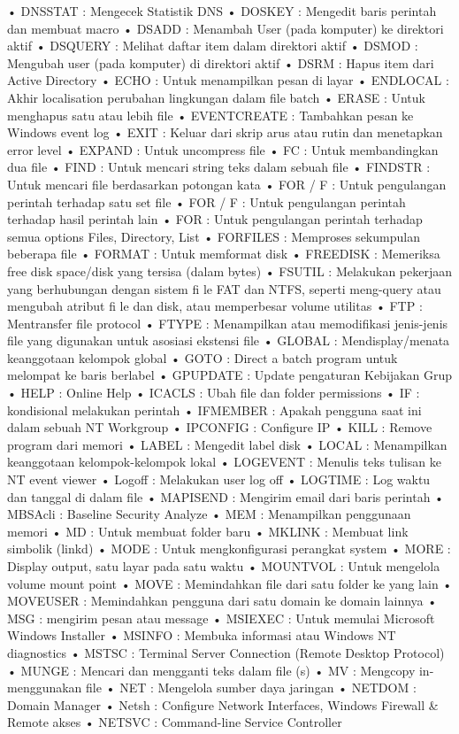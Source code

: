 \documentclass{article}
\begin{document}
• DNSSTAT : Mengecek Statistik DNS
• DOSKEY : Mengedit baris perintah dan membuat macro
• DSADD : Menambah User (pada komputer) ke direktori aktif
• DSQUERY : Melihat daftar item dalam direktori aktif
• DSMOD : Mengubah user (pada komputer) di direktori aktif
• DSRM : Hapus item dari Active Directory
• ECHO : Untuk menampilkan pesan di layar
• ENDLOCAL : Akhir localisation  perubahan lingkungan dalam file batch
• ERASE : Untuk menghapus satu atau lebih file
• EVENTCREATE : Tambahkan pesan ke Windows event log
• EXIT : Keluar dari skrip arus atau rutin dan menetapkan error level
• EXPAND : Untuk uncompress file
• FC : Untuk membandingkan dua file
• FIND : Untuk mencari string teks dalam sebuah file
• FINDSTR : Untuk mencari file berdasarkan potongan kata
• FOR / F : Untuk pengulangan perintah terhadap satu set file
• FOR / F : Untuk pengulangan perintah terhadap hasil perintah lain
• FOR : Untuk pengulangan perintah terhadap semua options Files, Directory, List
• FORFILES : Memproses sekumpulan beberapa file
• FORMAT : Untuk memformat disk
• FREEDISK : Memeriksa free disk space/disk yang tersisa (dalam bytes)
• FSUTIL :  Melakukan pekerjaan yang berhubungan dengan sistem fi le FAT dan NTFS, seperti meng-query atau mengubah atribut fi le dan disk, atau memperbesar  volume utilitas
• FTP : Mentransfer file  protocol
• FTYPE : Menampilkan atau memodifikasi jenis-jenis file yang digunakan untuk  asosiasi ekstensi file
• GLOBAL : Mendisplay/menata keanggotaan kelompok global
• GOTO : Direct a batch program untuk melompat ke baris berlabel
• GPUPDATE : Update pengaturan Kebijakan Grup
• HELP : Online Help
• ICACLS : Ubah file dan folder permissions
• IF : kondisional melakukan perintah
• IFMEMBER : Apakah pengguna saat ini dalam sebuah NT Workgroup
• IPCONFIG : Configure IP
• KILL : Remove program dari memori
• LABEL : Mengedit label disk
• LOCAL : Menampilkan keanggotaan kelompok-kelompok lokal
• LOGEVENT : Menulis teks tulisan ke NT event viewer
• Logoff : Melakukan user log off
• LOGTIME : Log waktu dan tanggal di dalam file
• MAPISEND : Mengirim email dari baris perintah
• MBSAcli : Baseline Security Analyze
• MEM : Menampilkan penggunaan memori 
• MD : Untuk membuat folder baru
• MKLINK : Membuat link simbolik (linkd) 
• MODE : Untuk mengkonfigurasi perangkat system
• MORE : Display output, satu layar pada satu waktu 
• MOUNTVOL : Untuk mengelola volume mount point 
• MOVE : Memindahkan file dari satu folder ke yang lain 
• MOVEUSER : Memindahkan pengguna dari satu domain ke domain lainnya 
• MSG : mengirim pesan atau message 
• MSIEXEC : Untuk memulai Microsoft Windows Installer
• MSINFO : Membuka informasi atau Windows NT diagnostics
• MSTSC : Terminal Server Connection (Remote Desktop Protocol)
• MUNGE : Mencari dan mengganti teks dalam file (s)
• MV : Mengcopy in-menggunakan file
• NET : Mengelola sumber daya jaringan
• NETDOM : Domain Manager
• Netsh : Configure Network Interfaces, Windows Firewall & Remote akses
• NETSVC : Command-line Service Controller
\end{document}
